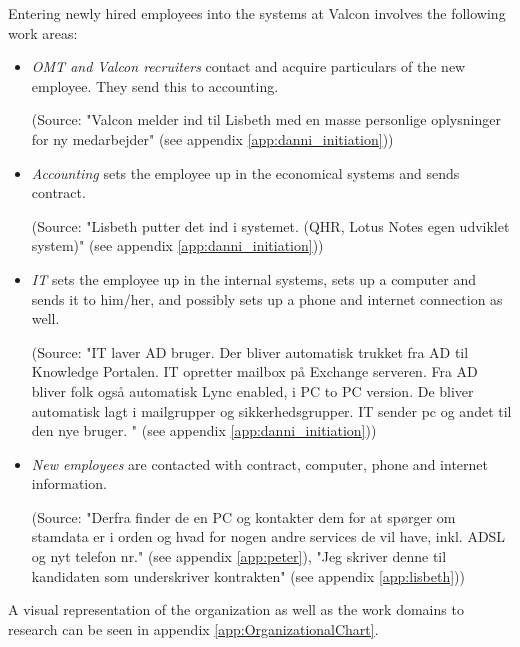 Entering newly hired employees into the systems at Valcon involves the following work areas:

\begin{itemize}
\item \emph{OMT and Valcon recruiters} contact and acquire particulars of the new employee. They send this to accounting. 

(Source: "Valcon melder ind til Lisbeth med en masse personlige oplysninger for ny medarbejder" (see appendix \ref{app:danni_initiation}))

\item \emph{Accounting} sets the employee up in the economical systems and sends contract. 

(Source: "Lisbeth putter det ind i systemet. (QHR, Lotus Notes egen udviklet system)" (see appendix \ref{app:danni_initiation}))

\item \emph{IT} sets the employee up in the internal systems, sets up a computer and sends it to him/her, and possibly sets up a phone and internet connection as well. 

(Source: "IT laver AD bruger. Der bliver automatisk trukket fra AD til Knowledge Portalen. IT opretter mailbox på Exchange serveren. Fra AD bliver folk også automatisk Lync enabled, i PC to PC version. De bliver automatisk lagt i mailgrupper og sikkerhedsgrupper. IT sender pc og andet til den nye bruger. " (see appendix \ref{app:danni_initiation}))

\item \emph{New employees} are contacted with contract, computer, phone and internet information. 

(Source: "Derfra finder de en PC og kontakter dem for at spørger om stamdata er i orden og hvad for nogen andre services de vil have, inkl. ADSL og nyt telefon nr." (see appendix \ref{app:peter}), "Jeg skriver denne til kandidaten som underskriver kontrakten" (see appendix \ref{app:lisbeth}))

\end{itemize}

A visual representation of the organization as well as the work domains to research can be seen in appendix \ref{app:OrganizationalChart}.